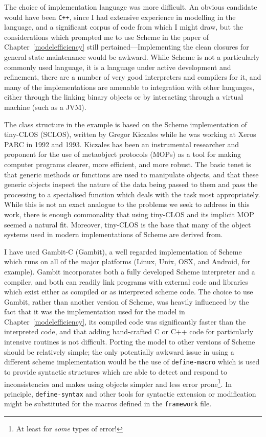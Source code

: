 The choice of implementation language was more difficult.  An obvious
candidate would have been \texttt{C++}, since I had extensive
experience in modelling in the language, and a significant corpus of
code from which I might draw, but the considerations which prompted me
to use Scheme in the paper of Chapter~\ref{modelefficiency} still
pertained---Implementing the clean closures for general state
maintenance would be awkward. While Scheme is not a particularly
commonly used language, it is a language under active development and
refinement, there are a number of very good interpreters and compilers
for it, and many of the implementations are amenable to integration
with other languages, either through the linking binary objects or by
interacting through a virtual machine (such as a JVM). 

The class structure in the example is based on the Scheme
implementation of tiny-CLOS (SCLOS), written by Gregor Kiczales
\cite{kiczales1993xerox} while he was working at Xeros PARC in 1992
and 1993.  Kiczales has been an instrumental researcher and proponent
for the use of metaobject protocols (MOPs) as a tool for making
computer programs clearer, more efficient, and more robust.  The basic
tenet is that generic methods or functions are used to manipulate
objects, and that these generic objects inspect the nature of the data
being passed to them and pass the processing to a specialised function
which deals with the task most appropriately.  While this is not an
exact analogue to the problems we seek to address in this work, there
is enough commonality that using tiny-CLOS and its implicit MOP seemed
a natural fit.  Moreover, tiny-CLOS is the base that many of the
object systems used in modern implementations of Scheme are derived
from.

I have used Gambit-C (Gambit), a well regarded implementation of
Scheme which runs on all of the major platforms (Linux, Unix, OSX, and
Android, for example). Gambit incorporates both a fully developed
Scheme interpreter and a compiler, and both can readily link programs
with external code and libraries which exist either as compiled or as
interpreted scheme code. The choice to use Gambit, rather than another
version of Scheme, was heavily influenced by the fact that it was the
implementation used for the model in Chapter~\ref{modelefficiency},
its compiled code was significantly faster than the interpreted code,
and that adding hand-crafted C or C++ code for particularly intensive
routines is not difficult.  Porting the model to other versions of
Scheme should be relatively simple; the only potentially awkward issue
in using a different scheme implementation would be the use of
\texttt{define-macro} which is used to provide syntactic structures
which are able to detect and respond to inconsistencies and makes
using objects simpler and less error prone\footnote{At least for
  \emph{some} types of error!}.  In principle, \texttt{define-syntax}
and other tools for syntactic extension or modification might be
substituted for the macros defined in the \texttt{framework} file. 

